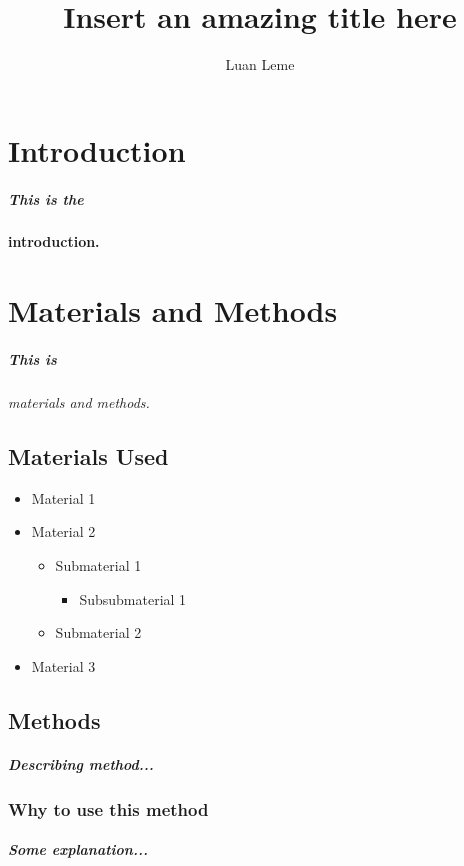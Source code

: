 \documentclass[11pt, a4paper]{article}
\title{Insert an amazing title here}
\author{Luan Leme}
\begin{document}
\maketitle

\chapter{Introduction}
\paragraph{This is the}\bf{introduction.}


\chapter{Materials and Methods}
\paragraph{This is}\it{materials and methods.}

\section{Materials Used}
\begin{itemize}
\item{Material 1}
\item{Material 2}
\begin{itemize}
\item{Submaterial 1}
\begin{itemize}
\item{Subsubmaterial 1}
\end{itemize}
\item{Submaterial 2}
\end{itemize}
\item{Material 3}
\end{itemize}

\section{Methods}
\paragraph{Describing method...}
\subsection{Why to use this method}
\paragraph{Some explanation...}
\end{document}
